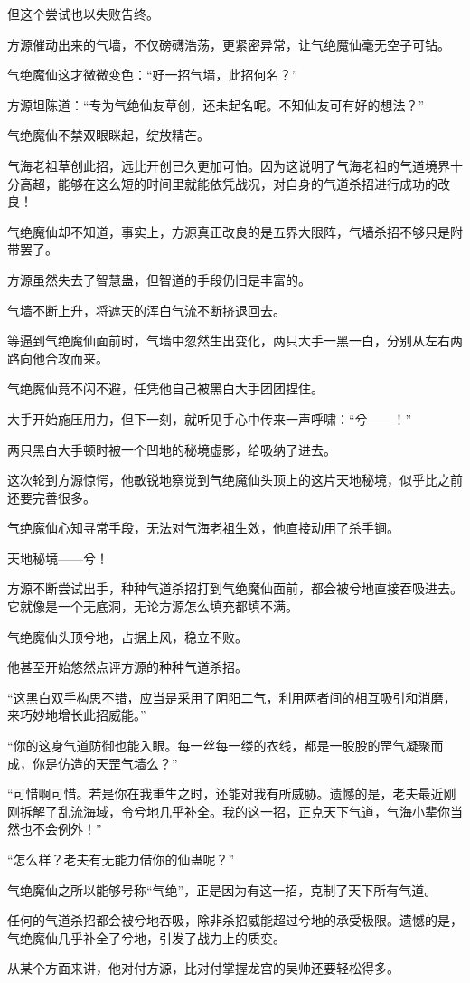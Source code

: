 \begin{this_body}
但这个尝试也以失败告终。

方源催动出来的气墙，不仅磅礴浩荡，更紧密异常，让气绝魔仙毫无空子可钻。

气绝魔仙这才微微变色：“好一招气墙，此招何名？”

方源坦陈道：“专为气绝仙友草创，还未起名呢。不知仙友可有好的想法？”

气绝魔仙不禁双眼眯起，绽放精芒。

气海老祖草创此招，远比开创已久更加可怕。因为这说明了气海老祖的气道境界十分高超，能够在这么短的时间里就能依凭战况，对自身的气道杀招进行成功的改良！

气绝魔仙却不知道，事实上，方源真正改良的是五界大限阵，气墙杀招不够只是附带罢了。

方源虽然失去了智慧蛊，但智道的手段仍旧是丰富的。

气墙不断上升，将遮天的浑白气流不断挤退回去。

等逼到气绝魔仙面前时，气墙中忽然生出变化，两只大手一黑一白，分别从左右两路向他合攻而来。

气绝魔仙竟不闪不避，任凭他自己被黑白大手团团捏住。

大手开始施压用力，但下一刻，就听见手心中传来一声呼啸：“兮——！”

两只黑白大手顿时被一个凹地的秘境虚影，给吸纳了进去。

这次轮到方源惊愕，他敏锐地察觉到气绝魔仙头顶上的这片天地秘境，似乎比之前还要完善很多。

气绝魔仙心知寻常手段，无法对气海老祖生效，他直接动用了杀手锏。

天地秘境——兮！

方源不断尝试出手，种种气道杀招打到气绝魔仙面前，都会被兮地直接吞吸进去。它就像是一个无底洞，无论方源怎么填充都填不满。

气绝魔仙头顶兮地，占据上风，稳立不败。

他甚至开始悠然点评方源的种种气道杀招。

“这黑白双手构思不错，应当是采用了阴阳二气，利用两者间的相互吸引和消磨，来巧妙地增长此招威能。”

“你的这身气道防御也能入眼。每一丝每一缕的衣线，都是一股股的罡气凝聚而成，你是仿造的天罡气墙么？”

“可惜啊可惜。若是你在我重生之时，还能对我有所威胁。遗憾的是，老夫最近刚刚拆解了乱流海域，令兮地几乎补全。我的这一招，正克天下气道，气海小辈你当然也不会例外！”

“怎么样？老夫有无能力借你的仙蛊呢？”

气绝魔仙之所以能够号称“气绝”，正是因为有这一招，克制了天下所有气道。

任何的气道杀招都会被兮地吞吸，除非杀招威能超过兮地的承受极限。遗憾的是，气绝魔仙几乎补全了兮地，引发了战力上的质变。

从某个方面来讲，他对付方源，比对付掌握龙宫的吴帅还要轻松得多。

\end{this_body}

